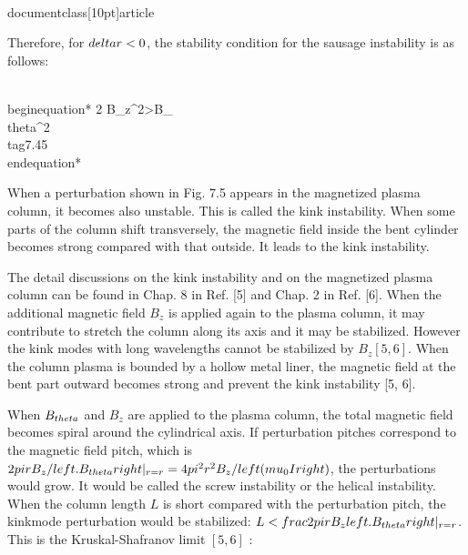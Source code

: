 \\documentclass[10pt]{article}
\begin{document}
{{{{Therefore, for $\\delta r<0$, the stability condition for the sausage instability is as follows:


\\begin{equation*}
2 B_{z}^{2}>B_{\\theta}^{2} \\tag{7.45}
\\end{equation*}


When a perturbation shown in Fig. 7.5 appears in the magnetized plasma column, it becomes also unstable. This is called the kink instability. When some parts of the column shift transversely, the magnetic field inside the bent cylinder becomes strong compared with that outside. It leads to the kink instability.

The detail discussions on the kink instability and on the magnetized plasma column can be found in Chap. 8 in Ref. [5] and Chap. 2 in Ref. [6]. When the additional magnetic field $B_{z}$ is applied again to the plasma column, it may contribute to stretch the column along its axis and it may be stabilized. However the kink modes with long wavelengths cannot be stabilized by $B_{z}[5,6]$. When the column plasma is bounded by a hollow metal liner, the magnetic field at the bent part outward becomes strong and prevent the kink instability [5, 6].

When $B_{\\theta}$ and $B_{z}$ are applied to the plasma column, the total magnetic field becomes spiral around the cylindrical axis. If perturbation pitches correspond to the magnetic field pitch, which is $2 \\pi r B_{z} /\\left.B_{\\theta}\\right|_{r=r}=4 \\pi^{2} r^{2} B_{z} /\\left(\\mu_{0} I\\right)$, the perturbations would grow. It would be called the screw instability or the helical instability. When the column length $L$ is short compared with the perturbation pitch, the kinkmode perturbation would be stabilized: $L<\\frac{2 \\pi r B_{z}}{\\left.B_{\\theta}\\right|_{r=r}}$. This is the Kruskal-Shafranov limit $[5,6]$ :


}}}}
\end{document}
